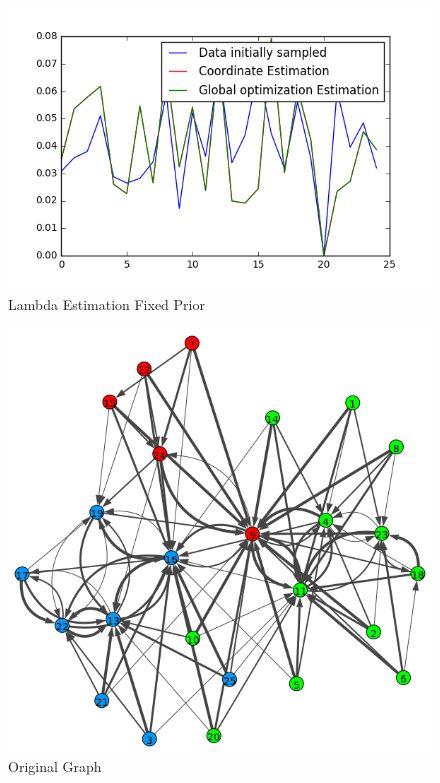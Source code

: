 \documentclass[12pt]{ociamthesis}  %
\begin{document}
	\begin{figure}
		\centering
		\includegraphics[width=\textwidth,height=\textheight,keepaspectratio]{LambdaEstimationFixedPrior}
		\caption{Lambda Estimation Fixed Prior}
		\label{label-image9}
	\end{figure}
	
	\begin{figure}
		\centering
		\includegraphics[width=\textwidth,height=\textheight,keepaspectratio]{OriginalPlotFixedPrior}
		\caption{Original Graph}
		\label{label-image10}
	\end{figure}
	
\end{document}
